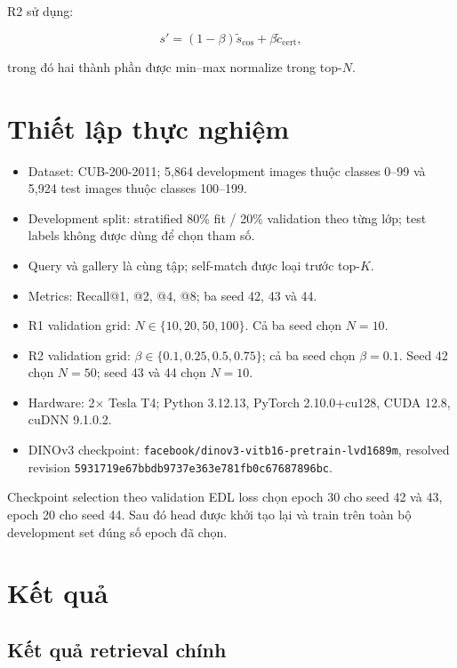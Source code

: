 \documentclass[11pt,a4paper]{article}
\begin{document}
R2 sử dụng:

\begin{equation}
s'=(1-\beta)\widetilde{s}_{\mathrm{cos}}
   +\beta\widetilde{c}_{\mathrm{cert}},
\end{equation}

trong đó hai thành phần được min--max normalize trong top-$N$.

\section{Thiết lập thực nghiệm}

\begin{itemize}
    \item Dataset: CUB-200-2011; 5,864 development images thuộc classes
    0--99 và 5,924 test images thuộc classes 100--199.
    \item Development split: stratified 80\% fit / 20\% validation theo
    từng lớp; test labels không được dùng để chọn tham số.
    \item Query và gallery là cùng tập; self-match được loại trước top-$K$.
    \item Metrics: Recall@1, @2, @4, @8; ba seed 42, 43 và 44.
    \item R1 validation grid:
    $N\in\{10,20,50,100\}$. Cả ba seed chọn $N=10$.
    \item R2 validation grid:
    $\beta\in\{0.1,0.25,0.5,0.75\}$; cả ba seed chọn $\beta=0.1$.
    Seed 42 chọn $N=50$; seed 43 và 44 chọn $N=10$.
    \item Hardware: 2$\times$ Tesla T4; Python 3.12.13,
    PyTorch 2.10.0+cu128, CUDA 12.8, cuDNN 9.1.0.2.
    \item DINOv3 checkpoint:
    \texttt{facebook/dinov3-vitb16-pretrain-lvd1689m}, resolved revision
    \texttt{5931719e67bbdb9737e363e781fb0c67687896bc}.
\end{itemize}

Checkpoint selection theo validation EDL loss chọn epoch 30 cho seed 42 và
43, epoch 20 cho seed 44. Sau đó head được khởi tạo lại và train trên toàn
bộ development set đúng số epoch đã chọn.

\section{Kết quả}

\subsection{Kết quả retrieval chính}
\end{document}
